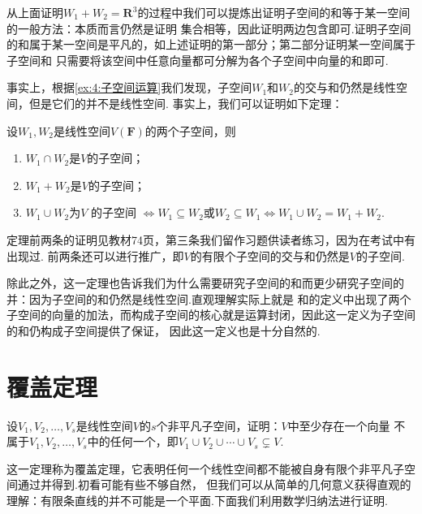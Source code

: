 从上面证明$W_1+W_2=\mathbf{R}^3$的过程中我们可以提炼出证明子空间的和等于某一空间的一般方法：本质而言仍然是证明
集合相等，因此证明两边包含即可.证明子空间的和属于某一空间是平凡的，如上述证明的第一部分；第二部分证明某一空间属于子空间和
只需要将该空间中任意向量都可分解为各个子空间中向量的和即可.

事实上，根据\autoref{ex:4:子空间运算}我们发现，子空间$W_1$和$W_2$的交与和仍然是线性空间，但是它们的并不是线性空间.
事实上，我们可以证明如下定理：
\begin{theorem}
    设$W_1,W_2$是线性空间$V(\mathbf{F})$的两个子空间，则
    \begin{enumerate}
        \item $W_1 \cap W_2$是$V$的子空间；
        \item $W_1 + W_2$是$V$的子空间；
        \item $W_1 \cup W_2$为$V\text{ 的子空间 } \iff W_1 \subseteq W_2$或$W_2 \subseteq W_1 \iff W_1 \cup W_2=W_1+W_2$.
    \end{enumerate}
\end{theorem}

定理前两条的证明见教材74页，第三条我们留作习题供读者练习，因为在考试中有出现过.
前两条还可以进行推广，即$V$的有限个子空间的交与和仍然是$V$的子空间.

除此之外，这一定理也告诉我们为什么需要研究子空间的和而更少研究子空间的并：因为子空间的和仍然是线性空间.直观理解实际上就是
和的定义中出现了两个子空间的向量的加法，而构成子空间的核心就是运算封闭，因此这一定义为子空间的和仍构成子空间提供了保证，
因此这一定义也是十分自然的.

\section{覆盖定理}
\begin{theorem}\label{thm:4:覆盖定理}
    设$V_1,V_2,\ldots,V_s$是线性空间$V$的$s$个非平凡子空间，证明：$V$中至少存在一个向量
    不属于$V_1,V_2,\ldots,V_s$中的任何一个，即$V_1 \cup V_2 \cup \cdots \cup V_s\subsetneq V.$
\end{theorem}

这一定理称为覆盖定理，它表明任何一个线性空间都不能被自身有限个非平凡子空间通过并得到.初看可能有些不够自然，
但我们可以从简单的几何意义获得直观的理解：有限条直线的并不可能是一个平面.下面我们利用数学归纳法进行证明.

